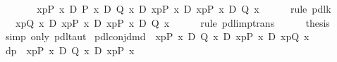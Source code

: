 \begin{isabellebody}
\ \ \isamarkupfalse%
\ \isamarkupfalse%
\ {\isachardoublequote}{\isasymturnstile}\ {\isacharbrackleft}{\isacharhash}\ x{\isasymleftarrow}p{\isacharbrackright}{\isacharparenleft}P\ x\ {\isasymlongrightarrow}\isactrlsub D\ P\ x\ {\isasymand}\isactrlsub D\ Q\ x{\isacharparenright}\ {\isasymlongrightarrow}\isactrlsub D\ {\isasymlangle}x{\isasymleftarrow}p{\isasymrangle}{\isacharparenleft}P\ x{\isacharparenright}\ {\isasymlongrightarrow}\isactrlsub D\ {\isasymlangle}x{\isasymleftarrow}p{\isasymrangle}{\isacharparenleft}P\ x\ {\isasymand}\isactrlsub D\ Q\ x{\isacharparenright}{\isachardoublequote}\isanewline
\ \ \ \ \isamarkupfalse%
\ {\isacharparenleft}rule\ pdl{\isacharunderscore}k{}{\isacharparenright}\isanewline
\ \ \isamarkupfalse%
\ \isamarkupfalse%
\ {\isachardoublequote}{\isasymturnstile}\ {\isacharbrackleft}{\isacharhash}\ x{\isasymleftarrow}p{\isacharbrackright}{\isacharparenleft}Q\ x{\isacharparenright}\ {\isasymlongrightarrow}\isactrlsub D\ {\isasymlangle}x{\isasymleftarrow}p{\isasymrangle}{\isacharparenleft}P\ x{\isacharparenright}\ {\isasymlongrightarrow}\isactrlsub D\ {\isasymlangle}x{\isasymleftarrow}p{\isasymrangle}{\isacharparenleft}P\ x\ {\isasymand}\isactrlsub D\ Q\ x{\isacharparenright}{\isachardoublequote}\isanewline
\ \ \ \ \isamarkupfalse%
\ {\isacharparenleft}rule\ pdl{\isacharunderscore}imp{\isacharunderscore}trans{\isacharparenright}\ \ %
\isanewline
\ \ \isamarkupfalse%
\ {\isacharquery}thesis\ \isamarkupfalse%
\ {\isacharparenleft}simp\ only{\isacharcolon}\ pdl{\isacharunderscore}taut{\isacharparenright}\isanewline
\isamarkupfalse%
\isanewline
\isanewline
\isamarkupfalse%
\ pdl{\isacharunderscore}conj{\isacharunderscore}dmd{\isacharcolon}\ {\isachardoublequote}{\isasymturnstile}\ {\isasymlangle}x{\isasymleftarrow}p{\isasymrangle}{\isacharparenleft}P\ x\ {\isasymand}\isactrlsub D\ Q\ x{\isacharparenright}\ {\isasymlongrightarrow}\isactrlsub D\ {\isasymlangle}x{\isasymleftarrow}p{\isasymrangle}{\isacharparenleft}P\ x{\isacharparenright}\ {\isasymand}\isactrlsub D\ {\isasymlangle}x{\isasymleftarrow}p{\isasymrangle}{\isacharparenleft}Q\ x{\isacharparenright}{\isachardoublequote}\isanewline
\isamarkupfalse%
\ {\isacharminus}\isanewline
\ \ %
\isanewline
\ \ \isamarkupfalse%
\ dp{\isacharcolon}\ {\isachardoublequote}{\isasymturnstile}\ {\isasymlangle}x{\isasymleftarrow}p{\isasymrangle}{\isacharparenleft}P\ x\ {\isasymand}\isactrlsub D\ Q\ x{\isacharparenright}\ {\isasymlongrightarrow}\isactrlsub D\ {\isasymlangle}x{\isasymleftarrow}p{\isasymrangle}{\isacharparenleft}P\ x{\isacharparenright}{\isachardoublequote}\isanewline

\end{isabellebody}
